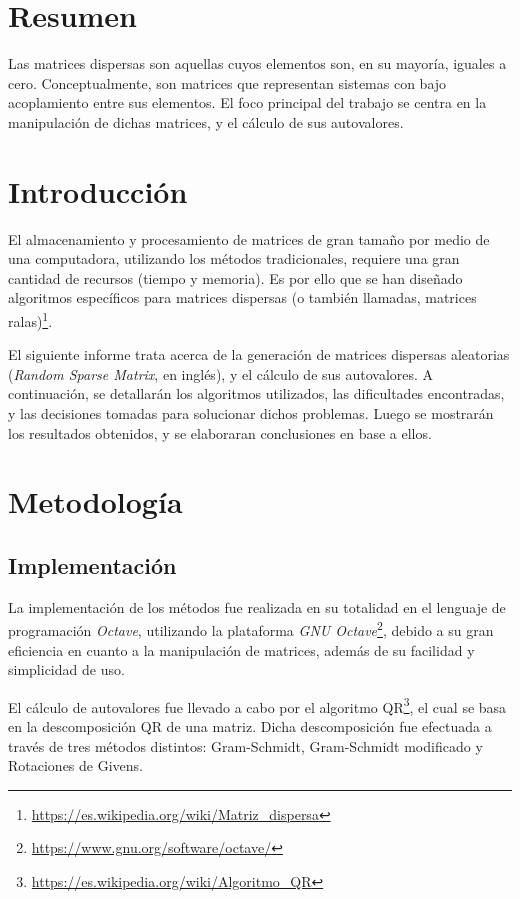 \documentclass[spanish]{article}
\begin{document}
    \clearpage
    
    \tableofcontents
    \clearpage

    \section{Resumen}
        \par Las matrices dispersas son aquellas cuyos elementos son, en su mayoría, iguales a cero. Conceptualmente, son matrices que representan sistemas con bajo acoplamiento entre sus elementos. El foco principal del trabajo se centra en la manipulación de dichas matrices, y el cálculo de sus autovalores.


    \section{Introducción}

        \par El almacenamiento y procesamiento de matrices de gran tamaño por medio de una computadora, utilizando los métodos tradicionales, requiere una gran cantidad de recursos (tiempo y memoria). Es por ello que se han diseñado algoritmos específicos para matrices dispersas (o también llamadas, matrices ralas)\footnote{\url{https://es.wikipedia.org/wiki/Matriz_dispersa}}.
        \par El siguiente informe trata acerca de la generación de matrices dispersas aleatorias (\textit{Random Sparse Matrix}, en inglés), y el cálculo de sus autovalores. A continuación, se detallarán los algoritmos utilizados, las dificultades encontradas, y las decisiones tomadas para solucionar dichos problemas. Luego se mostrarán los resultados obtenidos, y se elaboraran conclusiones en base a ellos.

    \section{Metodología}

        \subsection{Implementación}
        
            \par La implementación de los métodos fue realizada en su totalidad en el lenguaje de programación \textit{Octave}, utilizando la plataforma \textit{GNU Octave}\footnote{\url{https://www.gnu.org/software/octave/}}, debido a su gran eficiencia en cuanto a la manipulación de matrices, además de su facilidad y simplicidad de uso.
            \par El cálculo de autovalores fue llevado a cabo por el algoritmo QR\footnote{\url{https://es.wikipedia.org/wiki/Algoritmo_QR}}, el cual se basa en la descomposición QR de una matriz. Dicha descomposición fue efectuada a través de tres métodos distintos: Gram-Schmidt, Gram-Schmidt modificado y Rotaciones de Givens.
\end{document}
